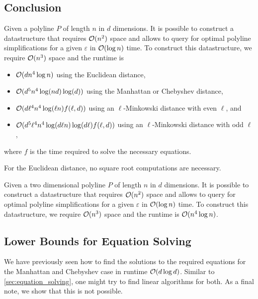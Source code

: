 \subsection{Conclusion}

\begin{theorem}\label{thm:query-ds}
	Given a polyline \(P\) of length \(n\) in \(d\) dimensions. It is possible to construct a datastructure that requires \(\mathcal{O}(n^2)\) space and allows to query for optimal polyline simplifications for a given \(\varepsilon\) in \(\mathcal{O}(\log n)\) time. To construct this datastructure, we require \(\mathcal{O}(n^3)\) space and the runtime is 
	\begin{itemize}
		\item \(\mathcal{O}(d n^4 \log n)\) using the Euclidean distance, 
		\item \(\mathcal{O}(d^5 n^4 \log(nd)\log(d))\) using the Manhattan or Chebyshev distance, 
		\item \(\mathcal{O}(d\ell^4 n^4 \log(\ell n)f(\ell, d))\) using an \(\ell\)-Minkowski distance with even \(\ell\), and 
		\item \(\mathcal{O}(d^5\ell^4 n^4 \log(d \ell n)\log(d \ell)f(\ell, d))\) using an \(\ell\)-Minkowski distance with odd \(\ell\),
	\end{itemize}

	where \(f\) is the time required to solve the necessary equations.

	For the Euclidean distance, no square root computations are necessary.
\end{theorem}

\begin{corollary}
	Given a two dimensional polyline \(P\) of length \(n\) in \(d\) dimensions. It is possible to construct a datastructure that requires \(\mathcal{O}(n^2)\) space and allows to query for optimal polyline simplifications for a given \(\varepsilon\) in \(\mathcal{O}(\log n)\) time. To construct this datastructure, we require \(\mathcal{O}(n^3)\) space and the runtime is \(\mathcal{O}(n^4 \log n)\).
\end{corollary}

\subsection{Lower Bounds for Equation Solving}
We have previously seen how to find the solutions to the required equations for the Manhattan and Chebyshev case in runtime \(\mathcal{O}(d \log d)\). Similar to \cref{sec:equation_solving}, one might try to find linear algorithms for both. As a final note, we show that this is not possible. 

